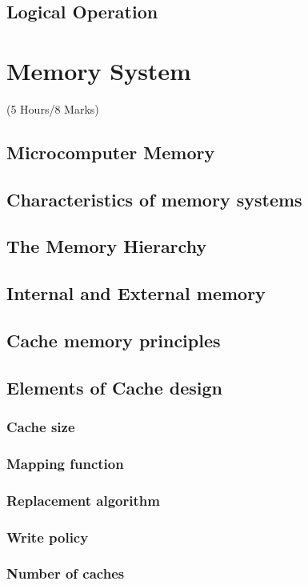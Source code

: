 \documentclass[12pt]{article}
\begin{document}
	\subsection{Logical Operation}

	\pagebreak
\section{Memory System}
\begin{center}(5 Hours/8 Marks)\end{center}
\subsection{Microcomputer Memory}
\subsection{Characteristics of memory systems}
\subsection{The Memory Hierarchy}
\subsection{Internal and External memory}
\subsection{Cache memory principles}
\subsection{Elements of Cache design}
\subsubsection{Cache size}
\subsubsection{Mapping function}
\subsubsection{Replacement algorithm}
\subsubsection{Write policy}
\subsubsection{Number of caches}
\end{document}
